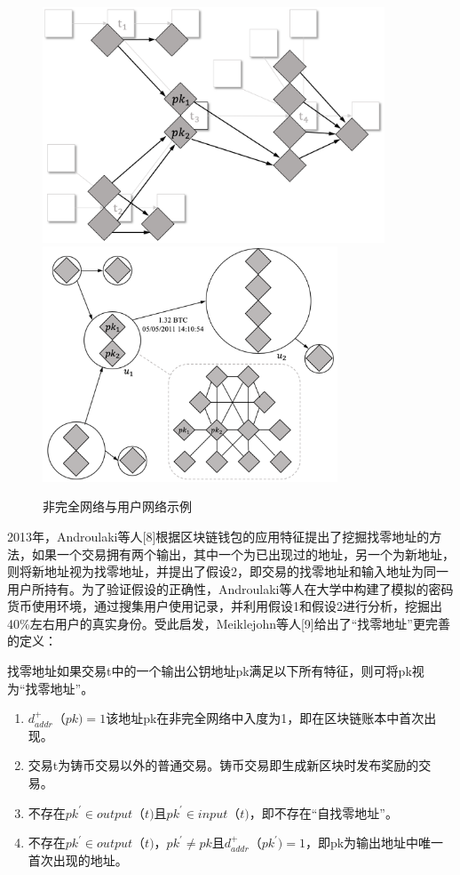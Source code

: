 \begin{figure}[ht]
  \centering%
    {\includegraphics[height=7cm]{figures/nc-network.png}}%
  \hspace{4em}%
      {\includegraphics[height=7cm]{figures/user-network.png}}
  \caption{非完全网络与用户网络示例}
  \label{fig:nc-user-network}
\end{figure}

2013年，Androulaki等人[8]根据区块链钱包的应用特征提出了挖掘找零地址的方法，如果一个交易拥有两个输出，其中一个为已出现过的地址，另一个为新地址，则将新地址视为找零地址，并提出了假设2，即交易的找零地址和输入地址为同一用户所持有。为了验证假设的正确性，Androulaki等人在大学中构建了模拟的密码货币使用环境，通过搜集用户使用记录，并利用假设1和假设2进行分析，挖掘出40\%左右用户的真实身份。受此启发，Meiklejohn等人[9]给出了“找零地址”更完善的定义：
	
找零地址如果交易t中的一个输出公钥地址pk满足以下所有特征，则可将pk视为“找零地址”。

\begin{enumerate}
	\item $d_{addr}^{+}（pk) = 1$该地址pk在非完全网络中入度为1，即在区块链账本中首次出现。
	\item 交易t为铸币交易以外的普通交易。铸币交易即生成新区块时发布奖励的交易。
	\item 不存在$pk^{'}\in  output（t)$且$pk^{'}\in  input（t)$，即不存在“自找零地址”。
	\item 不存在$pk^{'}\in  output（t)$，$pk^{'} \neq pk$且$d_{addr}^{+}（pk^{'}) = 1$，即pk为输出地址中唯一首次出现的地址。
\end{enumerate}

